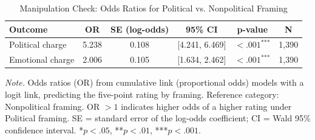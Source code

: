 \begin{table}[H]
\centering
\caption{Manipulation Check: Odds Ratios for Political vs. Nonpolitical Framing}
\label{tab:manip_check_or}
\begingroup
\footnotesize
\renewcommand{\arraystretch}{0.90}

\begin{tabularx}{\linewidth}{Xccccc}
\toprule
\textbf{Outcome} & \textbf{OR} & \textbf{SE (log-odds)} & \textbf{95\% CI} & \textbf{p-value} & \textbf{N} \\
\midrule
Political charge & 5.238 & 0.108 & [4.241, 6.469] & $< .001^{\text{***}}$ & 1,390 \\
Emotional charge & 2.006 & 0.105 & [1.634, 2.462] & $< .001^{\text{***}}$ & 1,390 \\
\bottomrule
\end{tabularx}

\vspace{0.6em}
{\footnotesize
\setlength{\baselineskip}{12pt}
\textit{Note.} Odds ratios (OR) from cumulative link (proportional odds) models with a logit link, predicting the five-point rating by framing. Reference category: Nonpolitical framing. OR $> 1$ indicates higher odds of a higher rating under Political framing. SE = standard error of the log-odds coefficient; CI = Wald 95\% confidence interval. *$p < .05$, **$p < .01$, ***$p < .001$.
\par}
\endgroup
\end{table}
